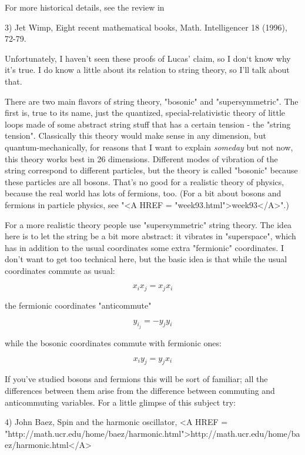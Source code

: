 For more historical details, see the review in 

3) Jet Wimp, Eight recent mathematical books, Math. Intelligencer
18 (1996), 72-79.

Unfortunately, I haven't seen these proofs of Lucas' claim, so I don`t
know why it's true.  I do know a little about its relation to 
string theory, so I'll talk about that.  

There are two main flavors of string theory, "bosonic" and
"supersymmetric".  The first is, true to its name, just the quantized,
special-relativistic theory of little loops made of some abstract 
string stuff that has a certain tension - the "string tension".  
Classically this theory would make sense in any dimension, but 
quantum-mechanically, for reasons that I want to explain \emph{someday} 
but not now, this theory works best in 26 dimensions.   Different 
modes of vibration of the string correspond to different particles, 
but the theory is called "bosonic" because these particles are all 
bosons.  That's no good for a realistic theory of physics, because
the real world has lots of fermions, too.  (For a bit about 
bosons and fermions in particle physics, see "<A HREF = "week93.html">week93</A>".)  

For a more realistic theory people use "supersymmetric" string
theory.  The idea here is to let the string be a bit more abstract:
it vibrates in "superspace", which has in addition to the usual
coordinates some extra "fermionic" coordinates.  I don't want to
get too technical here, but the basic idea is that while the usual
coordinates commute as usual:


$$

x_{i} x_{j} = x_{j} x_{i}
$$
    
the fermionic coordinates "anticommute"


$$

y_{i} _{j} = - y_{j} y_{i}
$$
    
while the bosonic coordinates commute with fermionic ones:


$$

x_{i} y_{j} = y_{j} x_{i }
$$
    
If you've studied bosons and fermions this will be sort of
familiar; all the differences between them arise from the difference 
between commuting and anticommuting variables.  For a little glimpse
of this subject try:

4) John Baez, Spin and the harmonic oscillator, 
<A HREF = "http://math.ucr.edu/home/baez/harmonic.html">http://math.ucr.edu/home/baez/harmonic.html</A>

